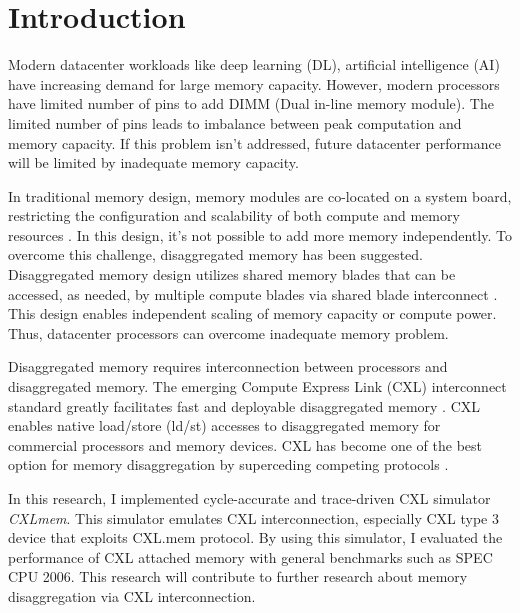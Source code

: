 \chapter{Introduction}

Modern datacenter workloads like deep learning (DL), artificial intelligence (AI) have increasing demand for large memory capacity. However, modern processors have limited number of pins to add DIMM (Dual in-line memory module). The limited number of pins leads to imbalance between peak computation and memory capacity. If this problem isn't addressed, future datacenter performance will be limited by inadequate memory capacity.

In traditional memory design, memory modules are co-located on a system board, restricting the configuration and scalability of both compute and memory resources \cite{disaggregate}. In this design, it's not possible to add more memory independently. To overcome this challenge, disaggregated memory has been suggested. Disaggregated memory design utilizes shared memory blades that can be accessed, as needed, by multiple compute blades via shared blade interconnect \cite{disaggregate}. This design enables independent scaling of memory capacity or compute power. Thus, datacenter processors can overcome inadequate memory problem.

Disaggregated memory requires interconnection between processors and disaggregated memory. The emerging Compute Express Link (CXL) interconnect standard \cite{CXL} greatly facilitates fast and deployable disaggregated memory \cite{first-generation}. CXL enables native load/store (ld/st) accesses to disaggregated memory for commercial processors and memory devices. CXL has become one of the best option for memory disaggregation by superceding competing protocols \cite{first-generation}.

In this research, I implemented cycle-accurate and trace-driven CXL simulator \textit{CXLmem}. This simulator emulates CXL interconnection, especially CXL type 3 device that exploits CXL.mem protocol. By using this simulator, I evaluated the performance of CXL attached memory with general benchmarks such as SPEC CPU 2006. This research will contribute to further research about memory disaggregation via CXL interconnection.

